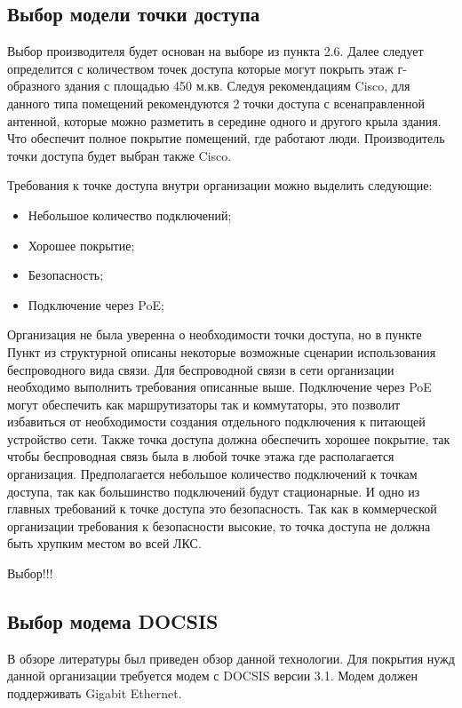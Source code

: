 \subsection{Выбор модели точки доступа}

Выбор производителя будет основан на выборе из пункта 2.6.
Далее следует определится с количеством точек доступа которые могут покрыть этаж г-образного здания
с площадью 450 м.кв. Следуя рекомендациям Cisco, для данного типа помещений рекомендуются 2 точки доступа с всенаправленной антенной,
которые можно разметить в середине одного и другого крыла здания. Что обеспечит полное покрытие помещений, где работают люди. 
Производитель точки доступа будет выбран также Cisco. 

Требования к точке доступа внутри организации можно выделить следующие:
\begin{itemize}
    \item Небольшое количество подключений;
    \item Хорошее покрытие;
    \item Безопасность;
    \item Подключение через PoE;
\end{itemize}

Организация не была уверенна о необходимости точки доступа, но в пункте {Пункт из структурной} описаны некоторые возможные сценарии использования беспроводного
вида связи. 
Для беспроводной связи в сети организации необходимо выполнить требования описанные выше. Подключение через PoE могут обеспечить как маршрутизаторы так и коммутаторы,
это позволит избавиться от необходимости создания отдельного подключения к питающей устройство сети. Также точка доступа должна обеспечить хорошее покрытие, так чтобы
беспроводная связь была в любой точке этажа где располагается организация. Предполагается небольшое количество подключений к точкам доступа,
так как большинство подключений будут стационарные. И одно из главных требований к точке доступа это безопасность. Так как в коммерческой организации требования 
к безопасности высокие, то точка доступа не должна быть хрупким местом во всей ЛКС.

Выбор!!!

\subsection{Выбор модема DOCSIS}

В обзоре литературы был приведен обзор данной технологии. Для покрытия нужд данной организации требуется модем с DOCSIS версии 
3.1. Модем должен поддерживать Gigabit Ethernet. 

